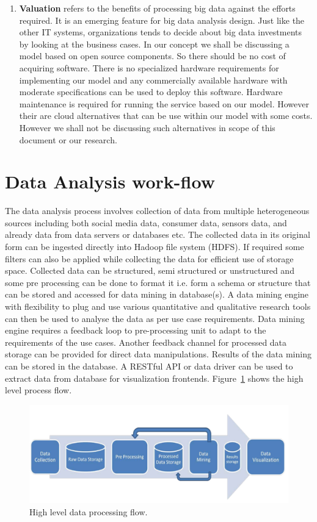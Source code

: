 \begin{enumerate}
\item \textbf{Valuation} refers to the benefits of processing big data against the efforts required. It is an emerging feature for big data analysis design. Just like the other IT systems, organizations tends to decide about big data investments by looking at the business cases. In our concept we shall be discussing a model based on open source components. So there should be no cost of acquiring software. There is no specialized hardware requirements for implementing our model and any commercially available hardware with moderate specifications can be used to deploy this software. Hardware maintenance is required for running the service based on our model. However their are cloud alternatives that can be use within our model with some costs. However we shall not be discussing such alternatives in scope of this document or our research.    
\end{enumerate} 
\section{Data Analysis work-flow} \label{workflow}
 The data analysis process involves collection of data from multiple heterogeneous sources including both social media data, consumer data, sensors data, and already data from data servers or databases etc. The collected data in its original form can be ingested directly into Hadoop file system (HDFS). If required some filters can also be applied while collecting the data for efficient use of storage space. Collected data can be structured, semi structured or unstructured and some pre processing can be done to format it i.e. form a schema or structure that can be stored and accessed for data mining in database(s). A data mining engine with flexibility to plug and use various quantitative and qualitative research tools can then be used to analyse the data as per use case requirements. Data mining engine requires a feedback loop to pre-processing unit to adapt to the requirements of the use cases. Another feedback channel for processed data storage can be provided for direct data manipulations. Results of the data mining can be stored in the database. A RESTful API or data driver can be used to extract data from database for visualization frontends. Figure~\ref{fig:process} shows the high level process flow.
 \begin{figure}[!h]
   \begin{center}
     \includegraphics[width=\textwidth]{images/process.pdf}
     \caption{High level data processing flow.}
     \label{fig:process}
   \end{center}
 \end{figure} 
